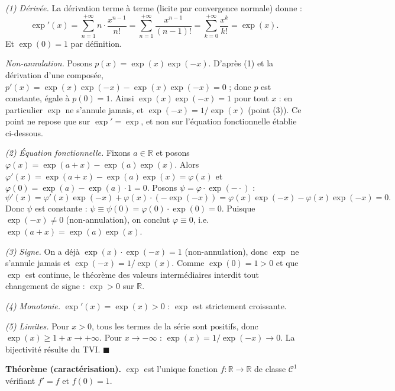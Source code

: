\begin{mdframed}[style=proofbar]
  \textit{(1) Dérivée.}
  La dérivation terme à terme (licite par convergence normale) donne :
  \[
    \exp'(x) = \sum_{n=1}^{+\infty} n\cdot\frac{x^{n-1}}{n!}
    = \sum_{n=1}^{+\infty}\frac{x^{n-1}}{(n-1)!}
    = \sum_{k=0}^{+\infty}\frac{x^k}{k!} = \exp(x).
  \]
  Et $\exp(0) = 1$ par définition.

  \textit{Non-annulation.}
  Posons $p(x) = \exp(x)\exp(-x)$. D'après (1) et la dérivation d'une
  composée, $p'(x) = \exp(x)\exp(-x) - \exp(x)\exp(-x) = 0$ ; donc $p$ est
  constante, égale à $p(0) = 1$. Ainsi $\exp(x)\exp(-x) = 1$ pour tout $x$ :
  en particulier $\exp$ ne s'annule jamais, et $\exp(-x) = 1/\exp(x)$
  (point (3)). Ce point ne repose que sur $\exp' = \exp$, et non sur
  l'équation fonctionnelle établie ci-dessous.

  \textit{(2) Équation fonctionnelle.}
  Fixons $a \in \mathbb{R}$ et posons $\varphi(x) = \exp(a+x) - \exp(a)\exp(x)$.
  Alors $\varphi'(x) = \exp(a+x) - \exp(a)\exp(x) = \varphi(x)$
  et $\varphi(0) = \exp(a) - \exp(a)\cdot 1 = 0$.
  Posons $\psi = \varphi\cdot\exp(-\cdot)$ :
  \[
    \psi'(x) = \varphi'(x)\exp(-x) + \varphi(x)\cdot(-\exp(-x))
    = \varphi(x)\exp(-x) - \varphi(x)\exp(-x) = 0.
  \]
  Donc $\psi$ est constante : $\psi \equiv \psi(0) = \varphi(0)\cdot\exp(0) = 0$.
  Puisque $\exp(-x) \neq 0$ (non-annulation), on conclut $\varphi \equiv 0$,
  i.e.\ $\exp(a+x)=\exp(a)\exp(x)$.

  \textit{(3) Signe.}
  On a déjà $\exp(x)\cdot\exp(-x) = 1$ (non-annulation), donc $\exp$ ne
  s'annule jamais et $\exp(-x) = 1/\exp(x)$. Comme $\exp(0) = 1 > 0$ et que
  $\exp$ est continue, le théorème des valeurs intermédiaires interdit tout
  changement de signe : $\exp > 0$ sur $\mathbb{R}$.

  \textit{(4) Monotonie.}
  $\exp'(x) = \exp(x) > 0$ : $\exp$ est strictement croissante.

  \textit{(5) Limites.}
  Pour $x > 0$, tous les termes de la série sont positifs, donc
  $\exp(x) \geq 1 + x \to +\infty$. Pour $x \to -\infty$ :
  $\exp(x) = 1/\exp(-x) \to 0$. La bijectivité résulte du TVI.
  \hfill$\blacksquare$
\end{mdframed}


\begin{tcolorbox}[thmbox]
  \textbf{Théorème (caractérisation).}\enspace%
  $\exp$ est l'unique fonction $f : \mathbb{R} \to \mathbb{R}$ de classe $\mathcal{C}^1$
  vérifiant $f' = f$ et $f(0) = 1$.
\end{tcolorbox}

